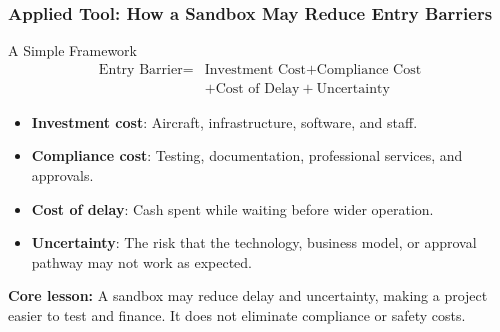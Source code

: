 \documentclass{beamer}
\begin{document}
\begin{frame}[t]
  \frametitle{Applied Tool: How a Sandbox May Reduce Entry Barriers}
  \begin{block}{A Simple Framework}
  \begin{align*}
        \text{Entry Barrier}= & \text{Investment Cost}+\text{Compliance Cost}\\&+\text{Cost of Delay}+\text{Uncertainty}
  \end{align*}
  \end{block}
  \begin{itemize}
    \item \textbf{Investment cost}: Aircraft, infrastructure, software, and staff.
    \item \textbf{Compliance cost}: Testing, documentation, professional services, and approvals.
    \item \textbf{Cost of delay}: Cash spent while waiting before wider operation.
    \item \textbf{Uncertainty}: The risk that the technology, business model, or approval pathway may not work as expected.
  \end{itemize}
  \textbf{Core lesson:} A sandbox may reduce delay and uncertainty, making a project easier to test and finance. It does not eliminate compliance or safety costs.
\end{frame}
\end{document}
